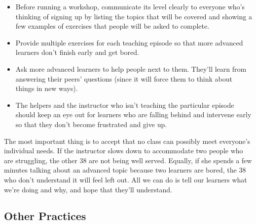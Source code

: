 \begin{itemize}
\itemsep1pt\parskip0pt
\item
  Before running a workshop, communicate its level clearly to everyone
  who's thinking of signing up by listing the topics that will be
  covered and showing a few examples of exercises that people will be
  asked to complete.
\item
  Provide multiple exercises for each teaching episode so that more
  advanced learners don't finish early and get bored.
\item
  Ask more advanced learners to help people next to them. They'll learn
  from answering their peers' questions (since it will force them to
  think about things in new ways).
\item
  The helpers and the instructor who isn't teaching the particular
  episode should keep an eye out for learners who are falling behind and
  intervene early so that they don't become frustrated and give up.
\end{itemize}

The most important thing is to accept that no class can possibly meet
everyone's individual needs. If the instructor slows down to accommodate
two people who are struggling, the other 38 are not being well served.
Equally, if she spends a few minutes talking about an advanced topic
because two learners are bored, the 38 who don't understand it will feel
left out. All we can do is tell our learners what we're doing and why,
and hope that they'll understand.

\subsection{Other Practices}\label{other-practices}

